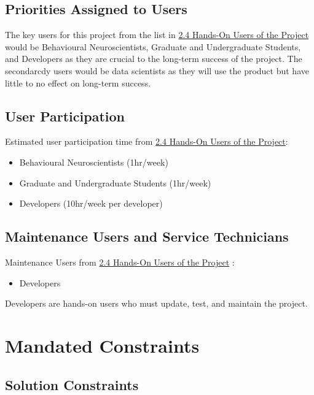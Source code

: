 \documentclass[12pt]{article}
\begin{document}
\subsection{Priorities Assigned to Users}

\par{The key users for this project from the list in \hyperref[sec:2.4handson]{2.4 Hands-On Users of the Project} 
would be Behavioural Neuroscientists, Graduate and Undergraduate Students, and Developers as they are crucial 
to the long-term success of the project. The secondarcdy users would be data scientists as they will use the product 
but have little to no effect on long-term success.}

\subsection{User Participation}

\par{Estimated user participation time from \hyperref[sec:2.4handson]{2.4 Hands-On Users of the Project}:}
\begin{itemize}
    \item Behavioural Neuroscientists (1hr/week)
    \item Graduate and Undergraduate Students (1hr/week)
    \item Developers (10hr/week per developer)
\end{itemize}

\subsection{Maintenance Users and Service Technicians}

\par{Maintenance Users from \hyperref[sec:2.4handson]{2.4 Hands-On Users of the Project} :}
\begin{itemize}
    \item Developers
\end{itemize}

\par{Developers are hands-on users who must update, test, and maintain the project.}

\section{Mandated Constraints}
\subsection{Solution Constraints}
\end{document}
